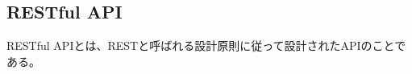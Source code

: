 \documentclass[../../../main]{subfiles}
\begin{document}
    \subsection{RESTful API}\label{subsec:phraseology-restful-api}

    RESTful APIとは、RESTと呼ばれる設計原則に従って設計されたAPIのことである。
\end{document}
